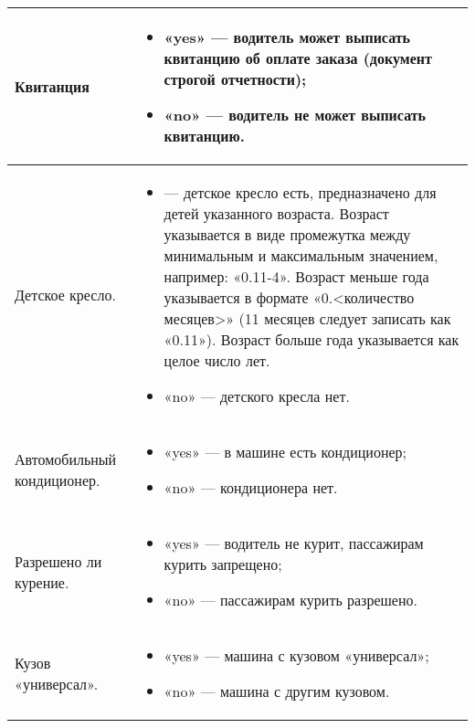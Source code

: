 \begin{longtable}{|p{4cm}|p{9cm}|}
					\hline	Квитанция & \begin{itemize} 
											\item «yes» — водитель может выписать квитанцию об оплате заказа (документ строгой отчетности);
											\item «no» — водитель не может выписать квитанцию.
										\end{itemize} \\ [2mm]
					\hline	Детское кресло. & 	\begin{itemize} 
													\item <возраст ребенка> — детское кресло есть, предназначено для детей указанного возраста. Возраст указывается в виде промежутка между минимальным и максимальным значением, например: «0.11-4». Возраст меньше года указывается в формате «0.<количество месяцев>» (11 месяцев следует записать как «0.11»). Возраст больше года указывается как целое число лет.
													\item «no» — детского кресла нет.
												\end{itemize} \\ [2mm]
					\hline	Автомобильный кондиционер. & 	\begin{itemize} 
																\item «yes» — в машине есть кондиционер;
																\item «no» — кондиционера нет.
															\end{itemize} \\ [2mm]
					\hline	Разрешено ли курение. & \begin{itemize} 
														\item «yes» — водитель не курит, пассажирам курить запрещено;
														\item «no» — пассажирам курить разрешено.
													\end{itemize} \\ [2mm]
					\hline	Кузов «универсал». &\begin{itemize} 
													\item «yes» — машина с кузовом «универсал»;
													\item «no» — машина с другим кузовом.
												\end{itemize}  \\ [2mm]
					\hline 
				\end{longtable}
